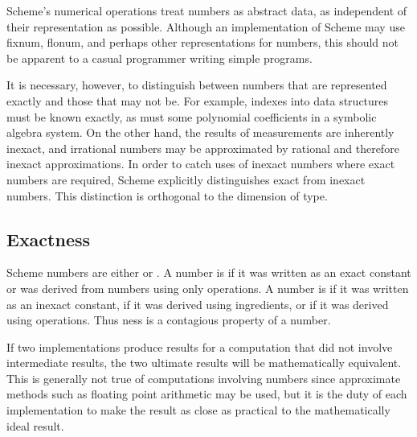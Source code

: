 
Scheme's numerical operations treat numbers as abstract data, as
independent of their representation as possible.  Although an implementation
of Scheme may use fixnum, flonum, and perhaps other representations for
numbers, this should not be apparent to a casual programmer writing
simple programs.

It is necessary, however, to distinguish between numbers that are
represented exactly and those that may not be.  For example, indexes
into data structures must be known exactly, as must some polynomial
coefficients in a symbolic algebra system.  On the other hand, the
results of measurements are inherently inexact, and irrational numbers
may be approximated by rational and therefore inexact approximations.
In order to catch uses of inexact numbers where exact numbers are
required, Scheme explicitly distinguishes exact from inexact numbers.
This distinction is orthogonal to the dimension of type.

\subsection{Exactness}


 \label{exactly}
Scheme numbers are either  or .  A number is
 if it was written as an exact constant or was derived from
 numbers using only  operations.  A number is
 if it was written as an inexact constant,
if it was
derived using  ingredients, or if it was derived using
 operations. Thus ness is a contagious
property of a number.

\vest If two implementations produce  results for a
computation that did not involve  intermediate results,
the two ultimate results will be mathematically equivalent.  This is
generally not true of computations involving  numbers
since approximate methods such as floating point arithmetic may be used,
but it is the duty of each implementation to make the result as close as
practical to the mathematically ideal result.

